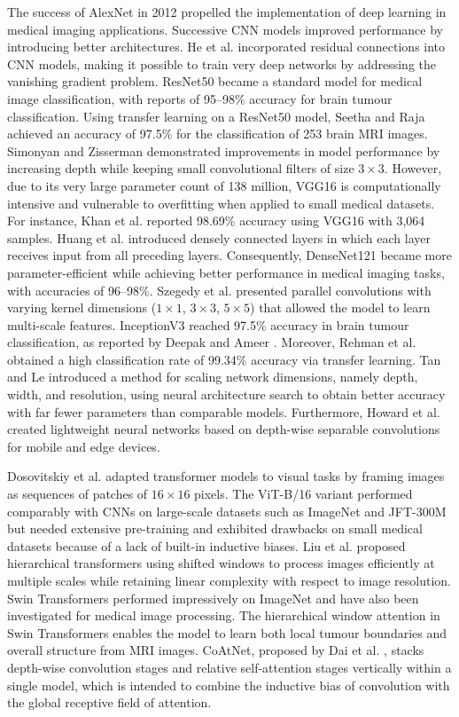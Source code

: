 \documentclass[final,3p,times,number]{elsarticle}
\begin{document}
The success of AlexNet in 2012 propelled the implementation of deep learning in medical imaging applications. Successive CNN models improved performance by introducing better architectures. He et al. \cite{ref6} incorporated residual connections into CNN models, making it possible to train very deep networks by addressing the vanishing gradient problem. ResNet50 became a standard model for medical image classification, with reports of 95--98\% accuracy for brain tumour classification. Using transfer learning on a ResNet50 model, Seetha and Raja \cite{ref12} achieved an accuracy of 97.5\% for the classification of 253 brain MRI images. Simonyan and Zisserman \cite{ref4} demonstrated improvements in model performance by increasing depth while keeping small convolutional filters of size $3\times 3$. However, due to its very large parameter count of 138 million, VGG16 is computationally intensive and vulnerable to overfitting when applied to small medical datasets. For instance, Khan et al. \cite{ref23} reported 98.69\% accuracy using VGG16 with 3,064 samples. Huang et al. \cite{ref9} introduced densely connected layers in which each layer receives input from all preceding layers. Consequently, DenseNet121 became more parameter-efficient while achieving better performance in medical imaging tasks, with accuracies of 96--98\%. Szegedy et al. \cite{ref7} presented parallel convolutions with varying kernel dimensions ($1\times 1$, $3\times 3$, $5\times 5$) that allowed the model to learn multi-scale features. InceptionV3 reached 97.5\% accuracy in brain tumour classification, as reported by Deepak and Ameer \cite{ref15}. Moreover, Rehman et al. \cite{ref25} obtained a high classification rate of 99.34\% accuracy via transfer learning. Tan and Le \cite{ref18} introduced a method for scaling network dimensions, namely depth, width, and resolution, using neural architecture search to obtain better accuracy with far fewer parameters than comparable models. Furthermore, Howard et al. \cite{ref19} created lightweight neural networks based on depth-wise separable convolutions for mobile and edge devices.

Dosovitskiy et al. \cite{ref28} adapted transformer models to visual tasks by framing images as sequences of patches of $16\times 16$ pixels. The ViT-B/16 variant performed comparably with CNNs on large-scale datasets such as ImageNet and JFT-300M but needed extensive pre-training and exhibited drawbacks on small medical datasets because of a lack of built-in inductive biases. Liu et al. \cite{ref29} proposed hierarchical transformers using shifted windows to process images efficiently at multiple scales while retaining linear complexity with respect to image resolution. Swin Transformers performed impressively on ImageNet and have also been investigated for medical image processing. The hierarchical window attention in Swin Transformers enables the model to learn both local tumour boundaries and overall structure from MRI images. CoAtNet, proposed by Dai et al. \cite{ref30}, stacks depth-wise convolution stages and relative self-attention stages vertically within a single model, which is intended to combine the inductive bias of convolution with the global receptive field of attention.
\end{document}
